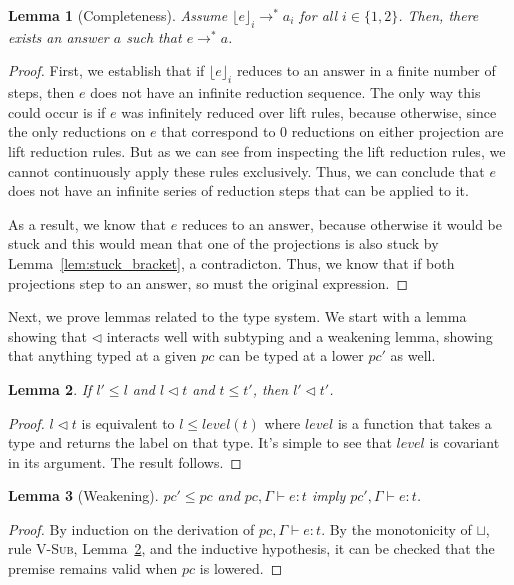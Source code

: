 \documentclass[a4paper,twocolumn]{article}
\newcommand{\typeRule}[3]{#1 \vdash #2 \colon #3}
\newcommand{\guards}[0]{\lhd}
\newcommand{\lift}[1]{\lfloor #1 \rfloor}
\theoremstyle{plain}
\newtheorem{lemma}{Lemma}
\theoremstyle{definition}
\begin{document}
\begin{lemma}[Completeness]
  \label{lem:completeness}
  Assume $\lift{e}_i \to^* a_i$ for all $i \in \{1, 2\}$.  Then, there exists an
  answer $a$ such that $e \to^* a$.
\end{lemma}
\begin{proof}
  First, we establish that if $\lift{e}_i$ reduces to an answer in a finite
  number of steps, then $e$ does not have an infinite reduction sequence.  The
  only way this could occur is if $e$ was infinitely reduced over lift rules,
  because otherwise, since the only reductions on $e$ that correspond to 0
  reductions on either projection are lift reduction rules.  But as we can see
  from inspecting the lift reduction rules, we cannot continuously apply these
  rules exclusively.  Thus, we can conclude that $e$ does not have an infinite
  series of reduction steps that can be applied to it.

  As a result, we know that $e$ reduces to an answer, because otherwise it would
  be stuck and this would mean that one of the projections is also stuck by
  Lemma~\ref{lem:stuck_bracket}, a contradicton.  Thus, we know that if both
  projections step to an answer, so must the original expression.
\end{proof}

Next, we prove lemmas related to the type system.  We start with a lemma showing
that $\guards$ interacts well with subtyping and a weakening lemma, showing that
anything typed at a given $pc$ can be typed at a lower $pc'$ as well.

\begin{lemma}
  \label{lem:guard_subtype}
  If $l' \leq l$ and $l \guards t$ and $t \leq t'$, then $l' \guards t'$.
\end{lemma}
\begin{proof}
  $l \guards t$ is equivalent to $l \leq level(t)$ where $level$ is a function
  that takes a type and returns the label on that type.  It's simple to see that
  $level$ is covariant in its argument.  The result follows.
\end{proof}

\begin{lemma}[Weakening]
  \label{lem:weakening}
  $pc' \leq pc$ and $\typeRule{pc, \Gamma}{e}{t}$ imply $\typeRule{pc',
  \Gamma}{e}{t}$.
\end{lemma}
\begin{proof}
  By induction on the derivation of $\typeRule{pc, \Gamma}{e}{t}$.  By the
  monotonicity of $\sqcup$, rule \textsc{V-Sub}, Lemma~\ref{lem:guard_subtype},
  and the inductive hypothesis, it can be checked that the premise remains valid
  when $pc$ is lowered.
\end{proof}
\end{document}
